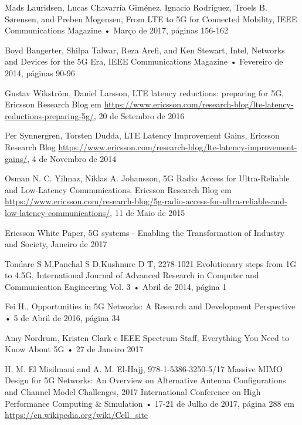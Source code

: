 \documentclass{llncs}
\begin{document}
%
%
\begin{thebibliography}{11}

 Mads Lauridsen, Lucas Chavarría Giménez, Ignacio Rodriguez, Troels B. Sørensen, and Preben Mogensen, From LTE to 5G for Connected Mobility, IEEE Communications Magazine • Março de 2017, páginas 156-162

 Boyd Bangerter, Shilpa Talwar, Reza Arefi, and Ken Stewart, Intel, Networks and Devices for the 5G Era, IEEE Communications Magazine • Fevereiro de 2014, páginas 90-96

 Gustav Wikström, Daniel Larsson, LTE latency reductions: preparing for 5G, Ericsson Research Blog em \url{https://www.ericsson.com/research-blog/lte-latency-reductions-preparing-5g/}, 20 de Setembro de 2016

 Per Synnergren, Torsten Dudda, LTE Latency Improvement Gains, Ericsson Research Blog \url{https://www.ericsson.com/research-blog/lte-latency-improvement-gains/}, 4 de Novembro de 2014

 Osman N. C. Yilmaz, Niklas A. Johansson, 5G Radio Access for Ultra-Reliable and Low-Latency Communications, Ericsson Research Blog em \url{https://www.ericsson.com/research-blog/5g-radio-access-for-ultra-reliable-and-low-latency-communications/}, 11 de Maio de 2015

 Ericsson White Paper, 5G systems - Enabling the Transformation of Industry and Society, Janeiro de 2017

 Tondare S M,Panchal S D,Kushnure D T,
 2278-1021
 Evolutionary steps from 1G to 4.5G,
 International Journal of Advanced Research in Computer and Communication Engineering Vol. 3
 • Abril de 2014, página 1

 Fei H.,
 Opportunities in 5G Networks: A Research and Development Perspective
 • 5 de Abril de 2016, página 34

 Amy Nordrum, Kristen Clark e IEEE Spectrum Staff,
 Everything You Need to Know About 5G
 • 27 de Janeiro 2017

 H. M. El Misilmani and A. M. El-Hajj,
 978-1-5386-3250-5/17
 Massive MIMO Design for 5G Networks: An Overview on Alternative Antenna Configurations and Channel Model Challenges,
 2017 International Conference on High Performance Computing \& Simulation
 • 17-21 de Julho de 2017, página 288
 em \url{https://en.wikipedia.org/wiki/Cell_site}


\end{thebibliography}
\end{document}
